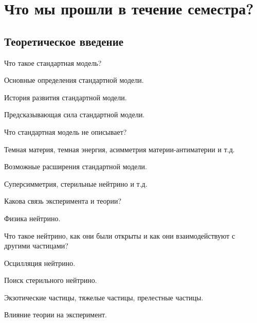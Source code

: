 \documentclass[a4paper,12pt]{report}
\begin{document}


  \section{Что мы прошли в течение семестра?}

  \subsection{Теоретическое введение}
  \begin{compactitem}
      \item Что такое стандартная модель?
      \begin{compactitem}
        \item Основные определения стандартной модели.
        \item История развития стандартной модели.
        \item Предсказывающая сила стандартной модели.
        \item Что стандартная модель не описывает?
        \begin{compactitem}
          \item Темная материя, темная энергия, асимметрия материи-антиматерии и т.д.
        \end{compactitem}
        \item Возможные расширения стандартной модели.
        \begin{compactitem}
          \item Суперсимметрия, стерильные нейтрино и т.д.
        \end{compactitem}
        \item Какова связь эксперимента и теории?
      \end{compactitem} 
      \item Физика нейтрино.
      \begin{compactitem}
        \item Что такое нейтрино, как они были открыты и как они взаимодействуют с другими частицами?
        \item Осцилляция нейтрино.
        \item Поиск стерильного нейтрино.
      \end{compactitem}
      \item Экзотические частицы, тяжелые частицы, прелестные частицы.
      \item Влияние теории на эксперимент.
  \end{compactitem}
\end{document}
